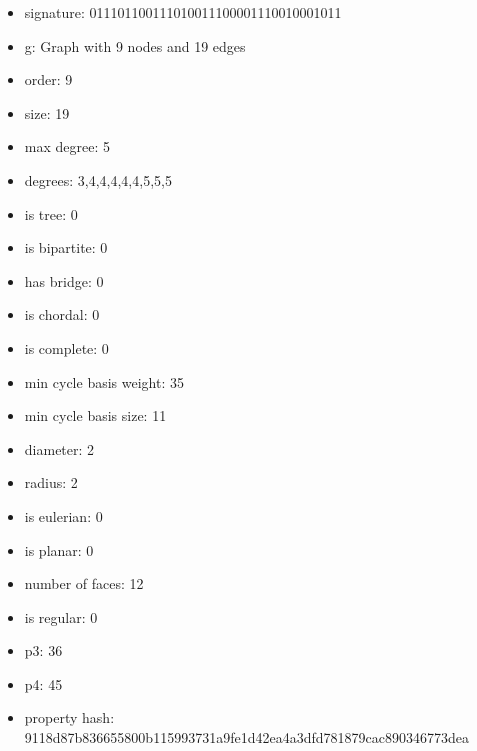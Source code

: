 \newpage
\begin{figure}
\end{figure}
\begin{itemize}
\item signature: 011101100111010011100001110010001011
\item g: Graph with 9 nodes and 19 edges
\item order: 9
\item size: 19
\item max degree: 5
\item degrees: 3,4,4,4,4,4,5,5,5
\item is tree: 0
\item is bipartite: 0
\item has bridge: 0
\item is chordal: 0
\item is complete: 0
\item min cycle basis weight: 35
\item min cycle basis size: 11
\item diameter: 2
\item radius: 2
\item is eulerian: 0
\item is planar: 0
\item number of faces: 12
\item is regular: 0
\item p3: 36
\item p4: 45
\item property hash: 9118d87b836655800b115993731a9fe1d42ea4a3dfd781879cac890346773dea
\end{itemize}
